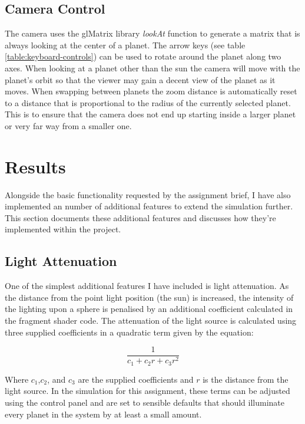 \documentclass[conference]{IEEEtran}
\begin{document}
\subsection{Camera Control}
The camera uses the glMatrix \cite{glmatrix} library \textit{lookAt} function to generate a matrix that is always looking at the center of a planet. The arrow keys (see table \ref{table:keyboard-controls}) can be used to rotate around the planet along two axes. When looking at a planet other than the sun the camera will move with the planet's orbit so that the viewer may gain a decent view of the planet as it moves. When swapping between planets the zoom distance is automatically reset to a distance that is proportional to the radius of the currently selected planet. This is to ensure that the camera does not end up starting inside a larger planet or very far way from a smaller one.

\section{Results}
\label{sec:advanced-features}
Alongside the basic functionality requested by the assignment brief, I have also implemented an number of additional features to extend the simulation further. This section documents these additional features and discusses how they're implemented within the project.

\subsection{Light Attenuation}
One of the simplest additional features I have included is light attenuation. As the distance from the point light position (the sun) is increased, the intensity of the lighting upon a sphere is penalised by an additional coefficient calculated in the fragment shader code.  The attenuation of the light source is calculated using three supplied coefficients in a  quadratic term given by the equation:

\begin{equation}
\frac{1}{c_1 + c_2r + c_3r^2}
\end{equation}

Where $c_1$,$c_2$, and $c_3$ are the supplied coefficients and $r$ is the distance from the light source. In the simulation for this assignment, these terms can be adjusted using the control panel and are set to sensible defaults that should illuminate every planet in the system by at least a small amount.
\end{document}
